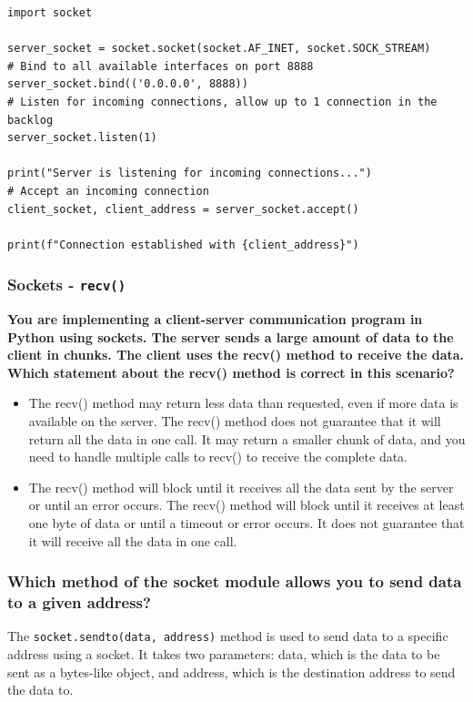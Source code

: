 \begin{codebox}
\begin{verbatim}
import socket

server_socket = socket.socket(socket.AF_INET, socket.SOCK_STREAM)
# Bind to all available interfaces on port 8888
server_socket.bind(('0.0.0.0', 8888))
# Listen for incoming connections, allow up to 1 connection in the backlog
server_socket.listen(1)

print("Server is listening for incoming connections...")
# Accept an incoming connection
client_socket, client_address = server_socket.accept()

print(f"Connection established with {client_address}")
\end{verbatim}
\end{codebox}

\subsubsection{Sockets - \texttt{recv()}}
\textbf{You are implementing a client-server communication program in Python using sockets. The server sends a large amount of data to the client in chunks. The client uses the recv() method to receive the data. Which statement about the recv() method is correct in this scenario?}
\begin{itemize}
\item The recv() method may return less data than requested, even if more data is available on the server. The recv() method does not guarantee that it will return all the data in one call. It may return a smaller chunk of data, and you need to handle multiple calls to recv() to receive the complete data.
\item The recv() method will block until it receives all the data sent by the server or until an error occurs. The recv() method will block until it receives at least one byte of data or until a timeout or error occurs. It does not guarantee that it will receive all the data in one call.
\end{itemize}

\subsubsection{Which method of the socket module allows you to send data to a given address?}
The \texttt{socket.sendto(data, address)} method is used to send data to a specific address using a socket. It takes two parameters: data, which is the data to be sent as a bytes-like object, and address, which is the destination address to send the data to.

